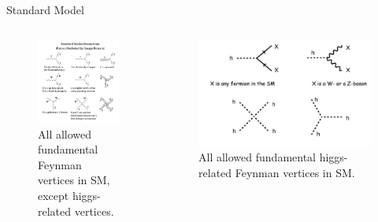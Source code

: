 \documentclass[mathserif,serif]{beamer}
\begin{document}
\begin{frame}{Standard Model}
\begin{columns}

\begin{column}{0.5\textwidth}
\begin{figure}
\centering
\includegraphics[width=\textwidth]{data/photo/theory/vertices_SM.png}
\caption{All allowed fundamental Feynman vertices in SM, except higgs-related vertices.}
\end{figure}

\end{column}

\begin{column}{0.5\textwidth}
\begin{figure}
\centering
\includegraphics[width=\textwidth]{data/photo/theory/vertices_higgs.png}
\caption{All allowed fundamental higgs-related Feynman vertices in SM.}
\end{figure}
\end{column}

\end{columns}
\end{frame}
\end{document}
